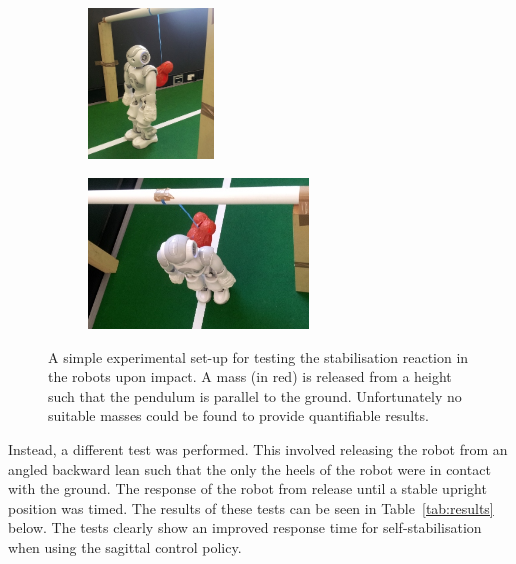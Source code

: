 \begin{figure}[h]
\centering
\begin{subfigure}{0.25\textwidth}
  \centering
  \includegraphics[height=4cm]{img/silly1.jpg}
\end{subfigure}
\begin{subfigure}{0.3\textwidth}
  \centering
  \includegraphics[height=4cm]{img/silly2.jpg}
\end{subfigure}
\caption{A simple experimental set-up for testing the stabilisation reaction in the robots upon impact. A mass (in red) is released from a height such that the pendulum is parallel to the ground. Unfortunately no suitable masses could be found to provide quantifiable results.}
\label{fig:silly_experiment}
\end{figure}

Instead, a different test was performed. This involved releasing the robot from an angled backward lean such that the only the heels of the robot were in contact with the ground. The response of the robot from release until a stable upright position was timed. The results of these tests can be seen in Table~\ref{tab:results} below. The tests clearly show an improved response time for self-stabilisation when using the sagittal control policy.


